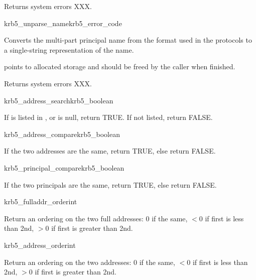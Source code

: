 Returns system errors XXX.

\begin{funcdecl}{krb5_unparse_name}{krb5_error_code}{\funcin}
\funcout
{}
\end{funcdecl}

Converts the multi-part principal name  from the
format used in the protocols to a single-string representation of the name.

 points to allocated storage and should be freed by the caller
when finished.

Returns system errors XXX.

\begin{funcdecl}{krb5_address_search}{krb5_boolean}{\funcin}
\end{funcdecl}

If  is listed in , or
 is null, return TRUE.  If not listed, return FALSE.

\begin{funcdecl}{krb5_address_compare}{krb5_boolean}{\funcin}
\end{funcdecl}

If the two addresses are the same, return TRUE, else return FALSE.

\begin{funcdecl}{krb5_principal_compare}{krb5_boolean}{\funcin}
\end{funcdecl}

If the two principals are the same, return TRUE, else return FALSE.

\begin{funcdecl}{krb5_fulladdr_order}{int}{\funcin}
\end{funcdecl}

Return an ordering on the two full addresses:  0 if the same,
$< 0$ if first is less than 2nd, $> 0$ if first is greater than 2nd.

\begin{funcdecl}{krb5_address_order}{int}{\funcin}
\end{funcdecl}

Return an ordering on the two addresses:  0 if the same,
$< 0$ if first is less than 2nd, $> 0$ if first is greater than 2nd.

